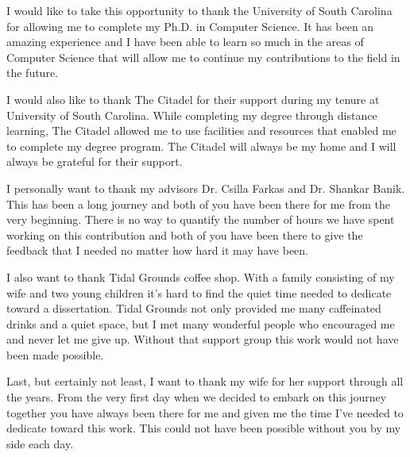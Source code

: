 I would like to take this opportunity to thank the University of South Carolina for allowing me to complete my Ph.D. in Computer Science. It has been an amazing experience and I have been able to learn so much in the areas of Computer Science that will allow me to continue my contributions to the field in the future.

I would also like to thank The Citadel for their support during my tenure at University of South Carolina. While completing my degree through distance learning, The Citadel allowed me to use facilities and resources that enabled me to complete my degree program. The Citadel will always be my home and I will always be grateful for their support.

I personally want to thank my advisors Dr. Csilla Farkas and Dr. Shankar Banik. This has been a long journey and both of you have been there for me from the very beginning. There is no way to quantify the number of hours we have spent working on this contribution and both of you have been there to give the feedback that I needed no matter how hard it may have been.

I also want to thank Tidal Grounds coffee shop. With a family consisting of my wife and two young children it's hard to find the quiet time needed to dedicate toward a dissertation. Tidal Grounds not only provided me many caffeinated drinks and a quiet space, but I met many wonderful people who encouraged me and never let me give up. Without that support group this work would not have been made possible.

Last, but certainly not least, I want to thank my wife for her support through all the years. From the very first day when we decided to embark on this journey together you have always been there for me and given me the time I've needed to dedicate toward this work. This could not have been possible without you by my side each day.